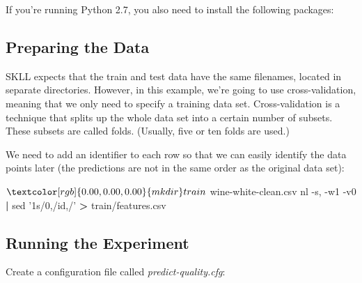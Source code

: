 \documentclass[
]{book}
\newenvironment{Shaded}{\begin{snugshade}}{\end{snugshade}}
\newcommand{\ExtensionTok}[1]{#1}
\newcommand{\FunctionTok}[1]{\textcolor[rgb]{0.00,0.00,0.00}{#1}}
\newcommand{\KeywordTok}[1]{\textcolor[rgb]{0.13,0.29,0.53}{\textbf{#1}}}
\newcommand{\NormalTok}[1]{#1}
\newcommand{\OperatorTok}[1]{\textcolor[rgb]{0.81,0.36,0.00}{\textbf{#1}}}
\newcommand{\StringTok}[1]{\textcolor[rgb]{0.31,0.60,0.02}{#1}}
\theoremstyle{definition}
\theoremstyle{definition}
\theoremstyle{definition}
\theoremstyle{remark}
\begin{document}
If you're running Python 2.7, you also need to install the following packages:

\begin{Shaded}
\end{Shaded}

\hypertarget{preparing-the-data}{%
\subsection{Preparing the Data}\label{preparing-the-data}}

SKLL expects that the train and test data have the same filenames, located in separate directories. However, in this example, we're going to use cross-validation, meaning that we only need to specify a training data set. Cross-validation is a technique that splits up the whole data set into a certain number of subsets. These subsets are called folds. (Usually, five or ten folds are used.)

We need to add an identifier to each row so that we can easily identify the data points later (the predictions are not in the same order as the original data set):

\begin{Shaded}
\begin{Highlighting}[]
\NormalTok{$ }\FunctionTok{mkdir}\NormalTok{ train}
\NormalTok{$ }\ExtensionTok{wine-white-clean.csv}\NormalTok{ nl -s, -w1 -v0 }\KeywordTok{|} \FunctionTok{sed} \StringTok{'1s/0,/id,/'} \OperatorTok{>}\NormalTok{ train/features.csv}
\end{Highlighting}
\end{Shaded}

\hypertarget{running-the-experiment}{%
\subsection{Running the Experiment}\label{running-the-experiment}}

Create a configuration file called \emph{predict-quality.cfg}:
\end{document}
